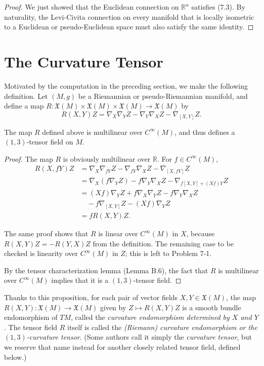 \begin{proof}
We just showed that the Euclidean connection on $\mathbb{R}^n$ satisfies (7.3). By naturality, the Levi-Civita connection on every manifold that is locally isometric to a Euclidean or pseudo-Euclidean space must also satisfy the same identity.
\end{proof}

\section{The Curvature Tensor}

Motivated by the computation in the preceding section, we make the following definition. Let $(M, g)$ be a Riemannian or pseudo-Riemannian manifold, and define a map $R: \mathfrak{X}(M) \times \mathfrak{X}(M) \times \mathfrak{X}(M) \to \mathfrak{X}(M)$ by
$$R(X,Y)Z = \nabla_X \nabla_Y Z - \nabla_Y \nabla_X Z - \nabla_{[X,Y]}Z.$$

\begin{proposition}
\label{prop:curvature-multilinearity}
The map $R$ defined above is multilinear over $C^\infty(M)$, and thus defines a $(1,3)$-tensor field on $M$.
\end{proposition}

\begin{proof}
The map $R$ is obviously multilinear over $\mathbb{R}$. For $f \in C^\infty(M)$,
\begin{align*}
R(X, fY)Z &= \nabla_X \nabla_{fY} Z - \nabla_{fY} \nabla_X Z - \nabla_{[X,fY]}Z\\
&= \nabla_X (f \nabla_Y Z) - f \nabla_Y \nabla_X Z - \nabla_{f[X,Y]+(Xf)Y}Z\\
&= (Xf)\nabla_Y Z + f\nabla_X \nabla_Y Z - f\nabla_Y \nabla_X Z\\
&\quad - f\nabla_{[X,Y]}Z - (Xf)\nabla_Y Z\\
&= fR(X,Y)Z.
\end{align*}

The same proof shows that $R$ is linear over $C^\infty(M)$ in $X$, because $R(X,Y)Z = -R(Y,X)Z$ from the definition. The remaining case to be checked is linearity over $C^\infty(M)$ in $Z$; this is left to Problem 7-1.

By the tensor characterization lemma (Lemma B.6), the fact that $R$ is multilinear over $C^\infty(M)$ implies that it is a $(1,3)$-tensor field.
\end{proof}

Thanks to this proposition, for each pair of vector fields $X, Y \in \mathfrak{X}(M)$, the map $R(X,Y): \mathfrak{X}(M) \to \mathfrak{X}(M)$ given by $Z \mapsto R(X,Y)Z$ is a smooth bundle endomorphism of $TM$, called the \emph{curvature endomorphism determined by $X$ and $Y$}. The tensor field $R$ itself is called the \emph{(Riemann) curvature endomorphism or the $(1, 3)$-curvature tensor}. (Some authors call it simply the \emph{curvature tensor}, but we reserve that name instead for another closely related tensor field, defined below.)

